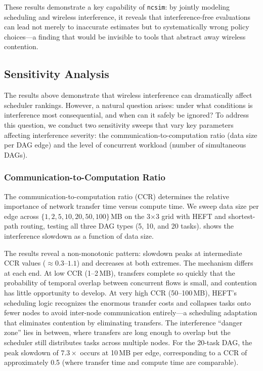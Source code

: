 \documentclass[conference]{IEEEtran}
\newcommand{\ncsim}{\texttt{ncsim}}
\begin{document}
These results demonstrate a key capability of \ncsim{}: by jointly modeling
scheduling and wireless interference, it reveals that interference-free
evaluations can lead not merely to inaccurate estimates but to
systematically wrong policy choices---a finding that would be invisible to
tools that abstract away wireless contention.


\subsection{Sensitivity Analysis}
\label{sec:sensitivity}

The results above demonstrate that wireless interference can dramatically
affect scheduler rankings.  However, a natural question arises: under what
conditions is interference most consequential, and when can it safely be
ignored?  To address this question, we conduct two sensitivity sweeps
that vary key parameters affecting interference severity: the
communication-to-computation ratio (data size per DAG edge) and the level
of concurrent workload (number of simultaneous DAGs).

\subsubsection{Communication-to-Computation Ratio}

The communication-to-computation ratio (CCR) determines the relative
importance of network transfer time versus compute time.  We sweep data
size per edge across $\{1, 2, 5, 10, 20, 50, 100\}$\,MB on the 3$\times$3
grid with HEFT and shortest-path routing, testing all three DAG types
(5, 10, and 20 tasks).   shows the interference slowdown
as a function of data size.

The results reveal a non-monotonic pattern: slowdown peaks at intermediate
CCR values (${\approx}0.3$--$1.1$) and decreases at both extremes.  The
mechanism differs at each end.  At low CCR (1--2\,MB), transfers complete
so quickly that the probability of temporal overlap between concurrent
flows is small, and contention has little opportunity to develop.  At very
high CCR (50--100\,MB), HEFT's scheduling logic recognizes the enormous
transfer costs and collapses tasks onto fewer nodes to avoid inter-node
communication entirely---a scheduling adaptation that eliminates contention
by eliminating transfers.  The interference ``danger zone'' lies in
between, where transfers are long enough to overlap but the scheduler
still distributes tasks across multiple nodes.  For the 20-task DAG, the
peak slowdown of $7.3\times$ occurs at 10\,MB per edge, corresponding to
a CCR of approximately 0.5 (where transfer time and compute time are
comparable).
\end{document}
